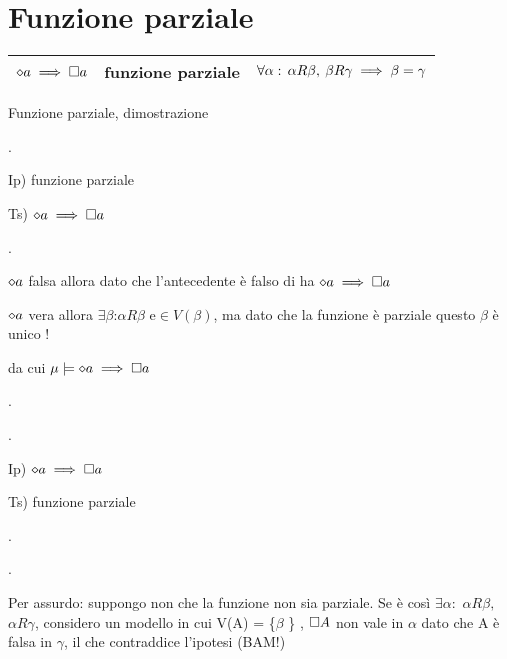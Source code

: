 \begin{center} 
\end{center}




\section{Funzione parziale}

\begin{tabular}{|c|c|c|}
\hline 
$\diamond a\implies\square a$  & funzione parziale  & $\forall\alpha:\,\alpha R\beta,\:\beta R\gamma\implies\beta=\gamma$\tabularnewline
\hline 
\end{tabular}

Funzione parziale, dimostrazione

.

Ip) funzione parziale

Ts) $\diamond a\implies\square a$ 

.

$\diamond a$ falsa allora dato che l'antecedente è falso di ha $\diamond a\implies\square a$

$\diamond a$ vera allora $\exists\beta$:$\alpha R\beta$ e$\in V(\beta)$,
ma dato che la funzione è parziale questo $\beta$ è unico !

da cui $\mu\models\diamond a\implies\square a$

.

.

Ip) $\diamond a\implies\square a$ 

Ts) funzione parziale

.

.

Per assurdo: suppongo non che la funzione non sia parziale. Se è così
$\exists\alpha:$ $\alpha R\beta,$ $\alpha R\gamma$, considero un
modello in cui V(A) = \{$\beta$ \} , $\square A$ non vale in $\alpha$
dato che A è falsa in $\gamma$, il che contraddice l'ipotesi (BAM!)\\
 \\
 


